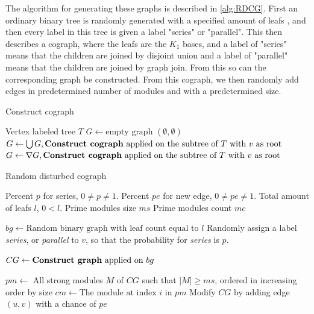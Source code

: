 \documentclass[a4paper]{article}
\begin{document}
The algorithm for generating these graphs is described in \autoref{alg:RDCG}.
First an ordinary binary tree is randomly generated with a specified amount of
leafs , and then every label in this tree is given a label "series" or
"parallel".  This then describes a cograph, where the leafs are the $K_1$ bases,
and a label of "series" means that the children are joined by disjoint union and
a label of "parallel" means that the children are joined by graph join.  From
this so can the corresponding graph be constructed. From this cograph, we then
randomly add edges in predetermined number of modules and with a predetermined
size. 

\begin{algorithm}[H]
    \caption{Construct cograph}
    \label{alg:constructcograph}
   \begin{algorithmic}[1]
        \REQUIRE Vertex labeled tree $T$
        \ENDIF
        \STATE $G \leftarrow \text{empty graph $(\emptyset,\emptyset)$}$
                \STATE $G \leftarrow \bigcup G, \text{\textbf{Construct cograph} applied
                on the subtree of $T$ with $v$ as root} $
                \STATE $G \leftarrow \nabla G, \text{\textbf{Construct cograph} applied
                on the subtree of $T$ with $v$ as root}$
            \ENDIF
        \ENDFOR
    \end{algorithmic}
\end{algorithm}

\begin{algorithm}[H]
    \caption{Random disturbed cograph}
  \label{alg:RDCG}
  \begin{algorithmic}[1]
      \REQUIRE Percent $p$ for series, $0 \neq p \neq 1$.
      \REQUIRE Percent $pe$ for new  edge, $0 \neq pe \neq 1$.
      \REQUIRE Total amount of leafs $l$, $0 < l$.
      \REQUIRE Prime modules size $ms$
      \REQUIRE Prime modules count $mc$

      \STATE $bg \leftarrow \text{Random binary graph with leaf count equal to $l$}$
        \STATE Randomly assign a label  \textit{series}, or \textit{parallel} to $v$, so
        that the probability for \textit{series} is $p$.
      \ENDFOR

      \STATE $CG \leftarrow \text{\textbf{Construct graph} applied on $bg$}$

      \STATE $pm \leftarrow $ All strong modules $M$ of $CG$ such that $|M| \geq ms$, ordered in increasing order by size
        \STATE $cm \leftarrow \text{The module at index $i$ in $pm$}$
            \STATE Modify $CG$ by adding edge $(u,v)$ with a chance of $pe$
        \ENDFOR
      \ENDFOR
  \end{algorithmic}
\end{algorithm}
\end{document}
